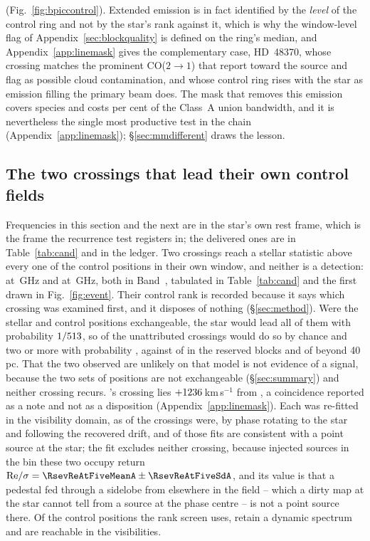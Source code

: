 (Fig.~\ref{fig:bpiccontrol}). Extended emission is in fact identified by the
\emph{level} of the control ring and not by the star's rank against it, which
is why the window-level flag of Appendix~\ref{sec:blockquality} is defined on
the ring's median, and Appendix~\ref{app:linemask} gives the complementary case,
HD~48370, whose crossing matches the prominent CO($2{\to}1$) that
\citet{Cataldi2023} report toward the source and flag as possible cloud
contamination, and whose control ring rises with the star as emission filling
the primary beam does. The mask that removes
this emission covers \FrNSpec{} species and costs \MkMaskAPct{} per cent of the
Class~A union bandwidth, and it is nevertheless the single most productive test
in the chain (Appendix~\ref{app:linemask}); \S\ref{sec:mmdifferent} draws the
lesson.

\subsection{The two crossings that lead their own control fields}
\label{sec:vistest}

Frequencies in this section and the next are in the star's own rest frame,
which is the frame the recurrence test registers in; the delivered ones are in
Table~\ref{tab:cand} and in the ledger. Two crossings reach a stellar statistic
above every one of the \NCtrl{} control positions in their own window, and
neither is a detection: \EvAStar{} at \RqFreqSx\,GHz and \EvBStar{} at
\RqFreqCp\,GHz, both in Band~\EvABand, tabulated in Table~\ref{tab:cand} and
the first drawn in Fig.~\ref{fig:event}. Their control rank is recorded because
it says which crossing was examined first, and it disposes of nothing
(\S\ref{sec:method}). Were the stellar and control positions exchangeable, the
star would lead all \NCtrl{} of them with probability $1/513$, so
\RkExpLead{} of the \RkNUnattr{} unattributed crossings would do so by chance
and two or more with probability \RkProbTwo, against \RkHoLead{} of \RkHoN{} in
the reserved blocks and \RkOosLead{} of \RkOosN{} beyond 40\,pc. That the two
observed are unlikely on that model is not evidence of a signal, because the
two sets of positions are not exchangeable (\S\ref{sec:summary}) and neither
crossing recurs. \EvBStar's crossing lies $+1236$\,km\,s$^{-1}$ from \EvBLine,
a coincidence reported as a note and not as a disposition
(Appendix~\ref{app:linemask}). Each was re-fitted in the visibility domain, as
\LgNFit{} of the \NCross{} crossings were, by phase rotating to the star and
following the recovered drift, and \LgNLocalCor{} of those fits are consistent
with a point source at the star; the fit excludes neither crossing, because
injected sources in the bin these two occupy return ${\rm
Re}/\sigma=\RsevReAtFiveMeanA\pm\RsevReAtFiveSdA$, and its value is that a
pedestal fed through a sidelobe from elsewhere in the field -- which a dirty
map at the star cannot tell from a source at the phase centre -- is not a point
source there. Of the \NCtrl{} control positions the rank screen uses,
\RcNRetCtrl{} retain a dynamic spectrum and \RcNVisCtrl{} are reachable in the
visibilities.

